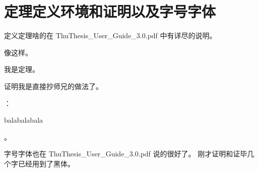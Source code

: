 
\chapter{定理定义环境和证明以及字号字体}
\label{cha:4}

定义定理啥的在 ThuThesis\_User\_Guide\_3.0.pdf 中有详尽的说明。


像这样。


\begin{theorem}
我是定理。
\end{theorem}

证明我是直接抄师兄的做法了。


：

balabalabala

。


字号字体也在 ThuThesis\_User\_Guide\_3.0.pdf 说的很好了。
刚才证明和证毕几个字已经用到了黑体。


